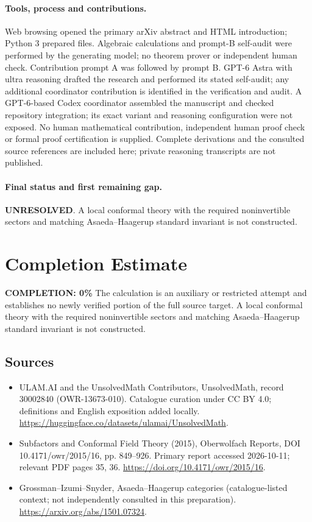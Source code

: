\documentclass[11pt]{article}
\begin{document}
\paragraph{Tools, process and contributions.}
Web browsing opened the primary arXiv abstract and HTML introduction; Python 3 prepared files. Algebraic calculations and prompt-B self-audit were performed by the generating model; no theorem prover or independent human check. Contribution prompt A was followed by prompt B. GPT-6 Astra with ultra reasoning drafted the research and performed its stated self-audit; any additional coordinator contribution is identified in the verification and audit. A GPT-6-based Codex coordinator assembled the manuscript and checked repository integration; its exact variant and reasoning configuration were not exposed. No human mathematical contribution, independent human proof check or formal proof certification is supplied. Complete derivations and the consulted source references are included here; private reasoning transcripts are not published.

\paragraph{Final status and first remaining gap.}
\textbf{UNRESOLVED}. A local conformal theory with the required noninvertible sectors and matching Asaeda–Haagerup standard invariant is not constructed.

\section{Completion Estimate}
\noindent\textbf{COMPLETION: 0\%}
The calculation is an auxiliary or restricted attempt and establishes no newly verified portion of the full source target. A local conformal theory with the required noninvertible sectors and matching Asaeda–Haagerup standard invariant is not constructed.

\subsection{Sources}
\begin{itemize}
\item[\hypertarget{source:30002840:1}{S1}] ULAM.AI and the UnsolvedMath Contributors, UnsolvedMath, record 30002840 (OWR-13673-010). Catalogue curation under CC BY 4.0; definitions and English exposition added locally.
\url{https://huggingface.co/datasets/ulamai/UnsolvedMath}.
\item[\hypertarget{source:30002840:2}{S2}] Subfactors and Conformal Field Theory (2015), Oberwolfach Reports, DOI 10.4171/owr/2015/16, pp. 849--926. Primary report accessed 2026-10-11; relevant PDF pages 35, 36.
\url{https://doi.org/10.4171/owr/2015/16}.
\item[\hypertarget{source:30002840:3}{S3}] Grossman--Izumi--Snyder, Asaeda--Haagerup categories (catalogue-listed context; not independently consulted in this preparation).
\url{https://arxiv.org/abs/1501.07324}.
\end{itemize}
\label{end:30002840}
\end{document}
